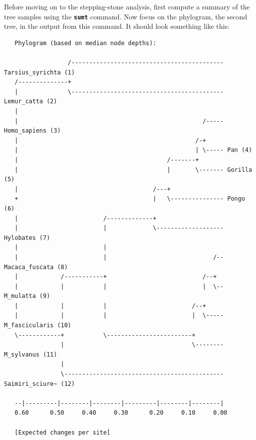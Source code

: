 \documentclass[12pt]{book}
\newcommand{\ttt}[1]{\texttt{#1}}
\newcommand{\tb}[1]{\ttt{\textbf{#1}}}
\begin{document}
Before moving on to the stepping-stone analysis, first compute a summary of the tree samples using
the \tb{sumt} command. Now focus on the phylogram, the second tree, in the output from this
command. It should look something like this:

\begin{singlespacing}
\scriptsize
\begin{verbatim}
   Phylogram (based on median node depths):

                  /------------------------------------------- Tarsius_syrichta (1)
   /--------------+                                                                
   |              \------------------------------------------- Lemur_catta (2)
   |                                                                               
   |                                                    /----- Homo_sapiens (3)
   |                                                  /-+                          
   |                                                  | \----- Pan (4)
   |                                          /-------+                            
   |                                          |       \------- Gorilla (5)
   |                                      /---+                                    
   +                                      |   \--------------- Pongo (6)
   |                        /-------------+                                        
   |                        |             \------------------- Hylobates (7)
   |                        |                                                      
   |                        |                              /-- Macaca_fuscata (8)
   |            /-----------+                           /--+                       
   |            |           |                           |  \-- M_mulatta (9)
   |            |           |                        /--+                          
   |            |           |                        |  \----- M_fascicularis (10)
   \------------+           \------------------------+                             
                |                                    \-------- M_sylvanus (11)
                |                                                                  
                \--------------------------------------------- Saimiri_sciure~ (12)
                                                                                   
   --|---------|--------|--------|---------|--------|--------|                     
   0.60      0.50     0.40     0.30      0.20     0.10     0.00                    

   [Expected changes per site]
\end{verbatim}
\normalsize
\end{singlespacing}
\end{document}
